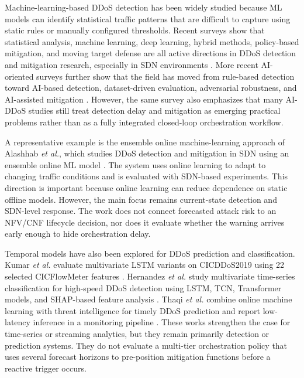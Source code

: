 \documentclass[12pt, a4paper, reqno, oneside]{book}
\begin{document}
Machine-learning-based DDoS detection has been widely studied because ML models
can identify statistical traffic patterns that are difficult to capture using
static rules or manually configured thresholds. Recent surveys show that
statistical analysis, machine learning, deep learning, hybrid methods,
policy-based mitigation, and moving target defense are all active directions
in DDoS detection and mitigation research, especially in SDN environments
\cite{hill2024ddos_sdn_survey}. More recent AI-oriented surveys further show
that the field has moved from rule-based detection toward AI-based detection,
dataset-driven evaluation, adversarial robustness, and AI-assisted mitigation
\cite{apostu2025ai_ddos_survey}. However, the same survey also emphasizes
that many AI-DDoS studies still treat detection delay and mitigation as
emerging practical problems rather than as a fully integrated closed-loop
orchestration workflow.

A representative example is the ensemble online machine-learning approach of
Alashhab \textit{et al.}, which studies DDoS detection and mitigation in SDN
using an ensemble online ML model \cite{alashhab2024ensemble_oml}. The system
uses online learning to adapt to changing traffic conditions and is evaluated
with SDN-based experiments. This direction is important because online learning
can reduce dependence on static offline models. However, the main focus remains
current-state detection and SDN-level response. The work does not connect
forecasted attack risk to an NFV/CNF lifecycle decision, nor does it evaluate
whether the warning arrives early enough to hide orchestration delay.

Temporal models have also been explored for DDoS prediction and classification.
Kumar \textit{et al.} evaluate multivariate LSTM variants on CICDDoS2019 using
22 selected CICFlowMeter features \cite{kumar2025multivariate}. Hernandez
\textit{et al.} study multivariate time-series classification for high-speed
DDoS detection using LSTM, TCN, Transformer models, and SHAP-based feature
analysis \cite{hernandez2025realtime_timeseries}. Thaqi \textit{et al.}
combine online machine learning with threat intelligence for timely DDoS
prediction and report low-latency inference in a monitoring pipeline
\cite{thaqi2026online_threat_intel}. These works strengthen the case for
time-series or streaming analytics, but they remain primarily detection or
prediction systems. They do not evaluate a multi-tier orchestration policy that
uses several forecast horizons to pre-position mitigation functions before a
reactive trigger occurs.
\end{document}

